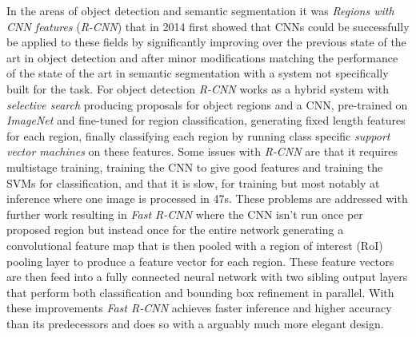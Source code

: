 \documentclass{kththesis}
\newcommand{\bibentry}[1]{\parencite{#1}}
\begin{document}
In the areas of object detection and semantic segmentation it was \emph{Regions
  with CNN features} (\emph{R-CNN}) \bibentry{girshick2014rich} that in 2014
first showed that CNNs could be successfully be applied to these fields by
significantly improving over the previous state of the art in object detection
\bibentry{ren2013histograms} and after minor modifications matching the
performance of the state of the art in semantic segmentation
\bibentry{carreira2012semantic} with a system not specifically built for the
task. For object detection \emph{R-CNN} works as a hybrid system with
\emph{selective search} \bibentry{uijlings2013selective} producing proposals for
object regions and a CNN, pre-trained on \emph{ImageNet}
\bibentry{deng2009imagenet} and fine-tuned for region classification, generating
fixed length features for each region, finally classifying each region by
running class specific \emph{support vector machines}
\bibentry{boser1992training} on these features. Some issues with \emph{R-CNN}
are that it requires multistage training, training the CNN to give good
features and training the SVMs for classification, and that it is slow, for
training but most notably at inference where one image is processed in 47s.
These problems are addressed with further work resulting in \emph{Fast R-CNN}
\bibentry{girshick2015fast} where the CNN isn't run once per proposed region but
instead once for the entire network generating a convolutional feature map that
is then pooled with a region of interest (RoI) pooling layer to produce a
feature vector for each region. These feature vectors are then feed into a fully
connected neural network with two sibling output layers that perform both
classification and bounding box refinement in parallel. With these improvements
\emph{Fast R-CNN} achieves faster inference and higher accuracy than its
predecessors and does so with a arguably much more elegant design.
\end{document}
